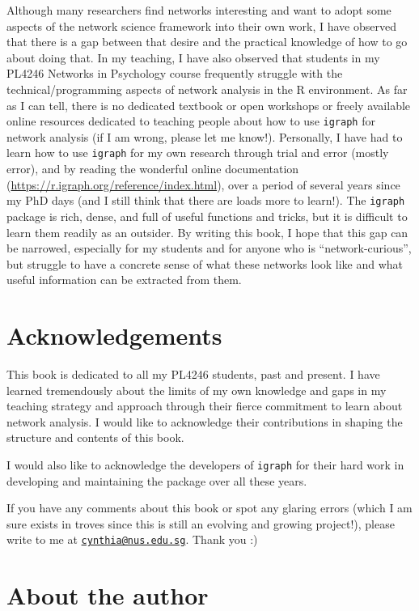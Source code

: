 \documentclass[
]{book}
\begin{document}
Although many researchers find networks interesting and want to adopt some aspects of the network science framework into their own work, I have observed that there is a gap between that desire and the practical knowledge of how to go about doing that. In my teaching, I have also observed that students in my PL4246 Networks in Psychology course frequently struggle with the technical/programming aspects of network analysis in the R environment. As far as I can tell, there is no dedicated textbook or open workshops or freely available online resources dedicated to teaching people about how to use \texttt{igraph} for network analysis (if I am wrong, please let me know!). Personally, I have had to learn how to use \texttt{igraph} for my own research through trial and error (mostly error), and by reading the wonderful online documentation (\url{https://r.igraph.org/reference/index.html}), over a period of several years since my PhD days (and I still think that there are loads more to learn!). The \texttt{igraph} package is rich, dense, and full of useful functions and tricks, but it is difficult to learn them readily as an outsider. By writing this book, I hope that this gap can be narrowed, especially for my students and for anyone who is ``network-curious'', but struggle to have a concrete sense of what these networks look like and what useful information can be extracted from them.

\section{Acknowledgements}\label{acknowledgements}

This book is dedicated to all my PL4246 students, past and present. I have learned tremendously about the limits of my own knowledge and gaps in my teaching strategy and approach through their fierce commitment to learn about network analysis. I would like to acknowledge their contributions in shaping the structure and contents of this book.

I would also like to acknowledge the developers of \texttt{igraph} for their hard work in developing and maintaining the package over all these years.

If you have any comments about this book or spot any glaring errors (which I am sure exists in troves since this is still an evolving and growing project!), please write to me at \href{mailto:cynthia@nus.edu.sg}{\nolinkurl{cynthia@nus.edu.sg}}. Thank you :)

\section{About the author}\label{about-the-author}
\end{document}
